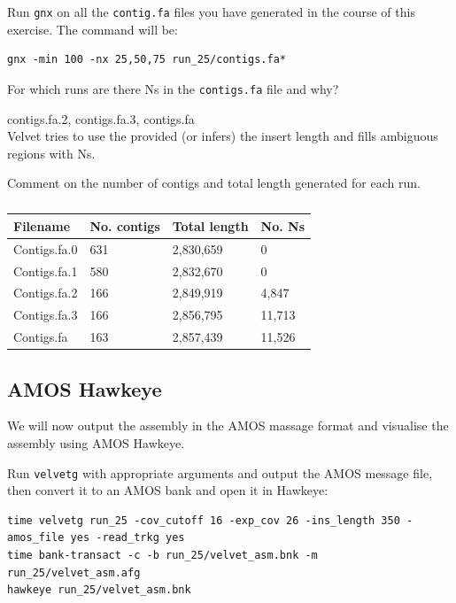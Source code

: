 \begin{steps}
Run \texttt{gnx} on all the \texttt{contig.fa} files you have generated in the
course of this exercise. The command will be:
\begin{lstlisting}
gnx -min 100 -nx 25,50,75 run_25/contigs.fa*
\end{lstlisting}
\end{steps}

\begin{questions}
For which runs are there Ns in the \texttt{contigs.fa} file and why? 
\begin{answer}
contigs.fa.2, contigs.fa.3, contigs.fa\\
Velvet tries to use the provided (or infers) the insert length and fills
ambiguous regions with Ns.
\end{answer}

Comment on the number of contigs and total length generated for each run.
\begin{answer}
\begin{table}[H]
    \begin{tabular}{llll}
    \toprule
    Filename & No. contigs & Total length & No. Ns \\
    \midrule
    Contigs.fa.0 & 631 & 2,830,659 & 0 \\
    Contigs.fa.1 & 580 & 2,832,670 & 0 \\
    Contigs.fa.2 & 166 & 2,849,919 & 4,847 \\
    Contigs.fa.3 & 166 & 2,856,795 & 11,713 \\
    Contigs.fa & 163 & 2,857,439 & 11,526 \\
    \bottomrule
    \end{tabular}%
  \caption{\label{tab:velvetrunresults}}%
\end{table}%
\end{answer}
\end{questions}

\subsection{AMOS Hawkeye}

We will now output the assembly in the AMOS massage format and visualise the
assembly using AMOS Hawkeye.

\begin{steps}
Run \texttt{velvetg} with appropriate arguments and output the AMOS message
file, then convert it to an AMOS bank and open it in Hawkeye:
\begin{lstlisting}
time velvetg run_25 -cov_cutoff 16 -exp_cov 26 -ins_length 350 -amos_file yes -read_trkg yes 
time bank-transact -c -b run_25/velvet_asm.bnk -m run_25/velvet_asm.afg         
hawkeye run_25/velvet_asm.bnk
\end{lstlisting}
\end{steps}

